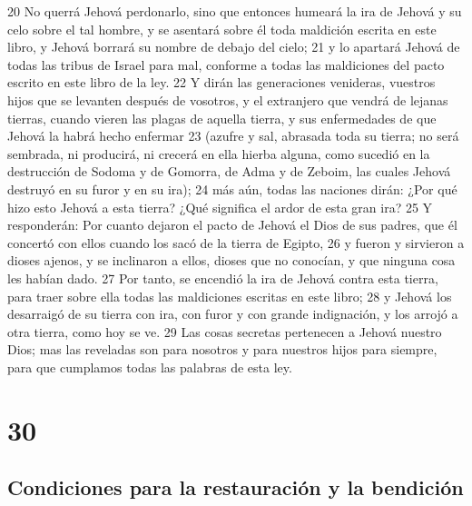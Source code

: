 20 No querrá Jehová perdonarlo, sino que entonces humeará la ira de Jehová y su celo sobre el tal hombre, y se asentará sobre él toda maldición escrita en este libro, y Jehová borrará su nombre de debajo del cielo;
21 y lo apartará Jehová de todas las tribus de Israel para mal, conforme a todas las maldiciones del pacto escrito en este libro de la ley.
22 Y dirán las generaciones venideras, vuestros hijos que se levanten después de vosotros, y el extranjero que vendrá de lejanas tierras, cuando vieren las plagas de aquella tierra, y sus enfermedades de que Jehová la habrá hecho enfermar
23 (azufre y sal, abrasada toda su tierra; no será sembrada, ni producirá, ni crecerá en ella hierba alguna, como sucedió en la destrucción de Sodoma y de Gomorra, de Adma y de Zeboim, las cuales Jehová destruyó en su furor y en su ira);
24 más aún, todas las naciones dirán: ¿Por qué hizo esto Jehová a esta tierra? ¿Qué significa el ardor de esta gran ira?
25 Y responderán: Por cuanto dejaron el pacto de Jehová el Dios de sus padres, que él concertó con ellos cuando los sacó de la tierra de Egipto,
26 y fueron y sirvieron a dioses ajenos, y se inclinaron a ellos, dioses que no conocían, y que ninguna cosa les habían dado.
27 Por tanto, se encendió la ira de Jehová contra esta tierra, para traer sobre ella todas las maldiciones escritas en este libro;
28 y Jehová los desarraigó de su tierra con ira, con furor y con grande indignación, y los arrojó a otra tierra, como hoy se ve.
29 Las cosas secretas pertenecen a Jehová nuestro Dios; mas las reveladas son para nosotros y para nuestros hijos para siempre, para que cumplamos todas las palabras de esta ley.

\chapter{30}


\section{Condiciones para la restauración y la bendición}


